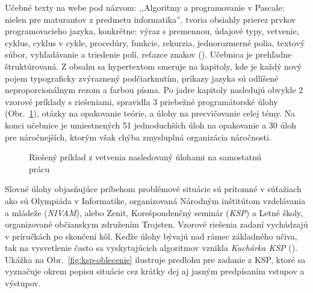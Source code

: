 Učebné texty na webe pod názvom: ,,Algoritmy a programovanie v Pascale: nielen pre maturantov z predmetu informatika'', tvoria obsiahly prierez prvkov programovacieho jazyka, konkrétne: výraz s premennou, údajové typy, vetvenie, cyklus, cyklus v cykle, procedúry, funkcie, rekurzia, jednorozmerné polia, textový súbor, vyhľadávanie a triedenie polí, reťazce znakov (\cite{hedvigova_algoritmy_2007}). Učebnica je prehľadne štruktúrovaná. Z obsahu sa hypertextom smeruje na kapitoly, kde je každý nový pojem typograficky zvýraznený podčiarknutím, príkazy jazyka sú odlíšené neproporcionálnym rezom a farbou písma. Po jadre kapitoly nasledujú obvykle 2 vzorové príklady s riešeniami, spravidla 3 priebežné programátorské úlohy (Obr.~\ref{fig:uloha-pascal}), otázky na opakovanie teórie, a úlohy na precvičovanie celej témy. Na konci učebnice je umiestnených 51 jednoduchších úloh na opakovanie a 30 úloh pre náročnejších, ktorým však chýba zmysluplná organizácia náročnosti.

\begin{figure}[h]
\centering
{}
\caption{Riešený príklad z vetvenia nasledovaný úlohami na samostatnú prácu}
\label{fig:uloha-pascal}
\end{figure}

Slovné úlohy objasňujúce príbehom problémové situácie sú prítomné v súťažiach ako sú Olympiáda v Informatike, organizovaná Národným inštitútom vzdelávania a mládeže (\emph{NIVAM}), alebo Zenit, Korešpondenčný seminár (\emph{KSP}) a Letné školy, organizované občianskym združením Trojsten. Vzorové riešenia zadaní vychádzajú v príručkách po skončení kôl. Keďže úlohy bývajú nad rámec základného učiva, tak na vysvetlenie často sa vyskytujúcich algoritmov vznikla \emph{Kuchárka KSP} (\cite{noauthor_kucharka_2022}). Ukážka na Obr.~\ref{fig:ksp-oblecenie} ilustruje predlohu pre zadanie z KSP, ktoré sa vyznačuje okrem popisu situácie cez krátky dej aj jasným predpísaním vstupov a výstupov. 

